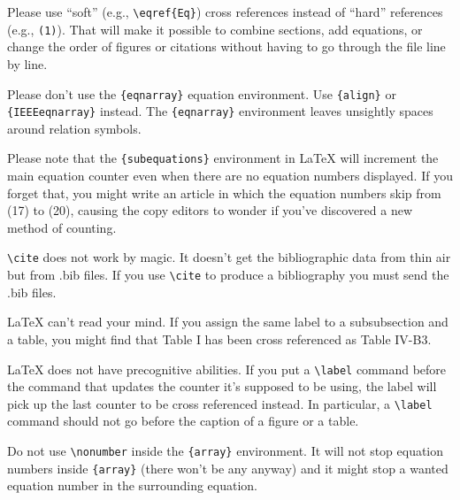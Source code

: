 \documentclass[conference]{IEEEtran}
\begin{document}
Please use ``soft'' (e.g., \verb|\eqref{Eq}|) cross references instead
of ``hard'' references (e.g., \verb|(1)|). That will make it possible
to combine sections, add equations, or change the order of figures or
citations without having to go through the file line by line.

Please don't use the \verb|{eqnarray}| equation environment. Use
\verb|{align}| or \verb|{IEEEeqnarray}| instead. The \verb|{eqnarray}|
environment leaves unsightly spaces around relation symbols.

Please note that the \verb|{subequations}| environment in {\LaTeX}
will increment the main equation counter even when there are no
equation numbers displayed. If you forget that, you might write an
article in which the equation numbers skip from (17) to (20), causing
the copy editors to wonder if you've discovered a new method of
counting.

\verb|\cite| does not work by magic. It doesn't get the bibliographic
data from thin air but from .bib files. If you use \verb|\cite| to produce a
bibliography you must send the .bib files. 

{\LaTeX} can't read your mind. If you assign the same label to a
subsubsection and a table, you might find that Table I has been cross
referenced as Table IV-B3. 

{\LaTeX} does not have precognitive abilities. If you put a
\verb|\label| command before the command that updates the counter it's
supposed to be using, the label will pick up the last counter to be
cross referenced instead. In particular, a \verb|\label| command
should not go before the caption of a figure or a table.

Do not use \verb|\nonumber| inside the \verb|{array}| environment. It
will not stop equation numbers inside \verb|{array}| (there won't be
any anyway) and it might stop a wanted equation number in the
surrounding equation.
\end{document}
